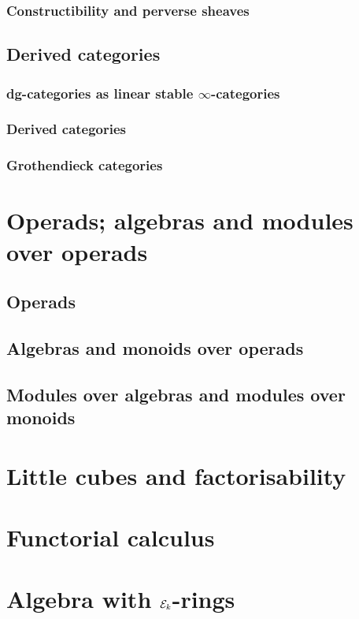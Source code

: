             \subsubsection{Constructibility and perverse sheaves}
            
        \subsection{Derived categories}
            \subsubsection{dg-categories as linear stable \texorpdfstring{$\infty$}{}-categories}
            
            \subsubsection{Derived categories}
            
            \subsubsection{Grothendieck categories}
    
    \section{Operads; algebras and modules over operads} \label{section: algebras_and_modules_over_operads}
        \subsection{Operads} \label{subsection: operads}
        
        \subsection{Algebras and monoids over operads}
        
        \subsection{Modules over algebras and modules over monoids}
    
    \section{Little cubes and factorisability}
    
    \section{Functorial calculus}
    
    \section{Algebra with \texorpdfstring{$\mathcal{E}_k$}{}-rings}